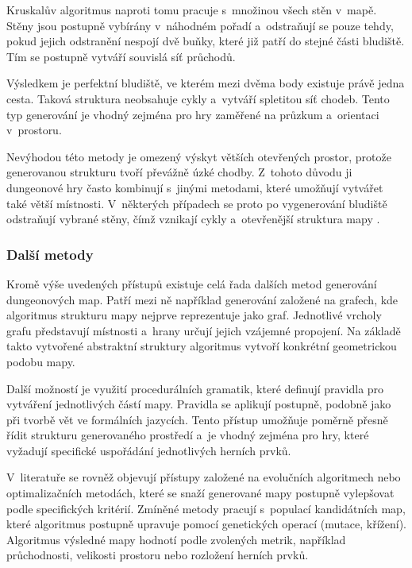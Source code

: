 \documentclass[
   program=itk,
   biblatex,
   figures=true,
   tables=true,
   glossaries,
   index
]{kidiplom}
\begin{document}
Kruskalův algoritmus naproti tomu pracuje s~množinou všech stěn v~mapě. Stěny jsou postupně vybírány v~náhodném pořadí a~odstraňují se pouze tehdy, pokud jejich odstranění nespojí dvě buňky, které již patří do stejné části bludiště. Tím se postupně vytváří souvislá síť průchodů.

Výsledkem je perfektní bludiště, ve kterém mezi dvěma body existuje právě jedna cesta. Taková struktura neobsahuje cykly a~vytváří spletitou síť chodeb. Tento typ generování je vhodný zejména pro hry zaměřené na průzkum a~orientaci v~prostoru.

Nevýhodou této metody je omezený výskyt větších otevřených prostor, protože generovanou strukturu tvoří převážně úzké chodby. Z~tohoto důvodu ji dungeonové hry často kombinují s~jinými metodami, které umožňují vytvářet také větší místnosti. V~některých případech se proto po vygenerování bludiště odstraňují vybrané stěny, čímž vznikají cykly a~otevřenější struktura mapy \cite{Linden2014,Shaker2016}.

\subsubsection{Další metody}

Kromě výše uvedených přístupů existuje celá řada dalších metod generování dungeonových map. Patří mezi ně například generování založené na grafech, kde algoritmus strukturu mapy nejprve reprezentuje jako graf. Jednotlivé vrcholy grafu představují místnosti a~hrany určují jejich vzájemné propojení. Na základě takto vytvořené abstraktní struktury algoritmus vytvoří konkrétní geometrickou podobu mapy.

Další možností je využití procedurálních gramatik, které definují pravidla pro vytváření jednotlivých částí mapy. Pravidla se aplikují postupně, podobně jako při tvorbě vět ve formálních jazycích. Tento přístup umožňuje poměrně přesně řídit strukturu generovaného prostředí a~je vhodný zejména pro hry, které vyžadují specifické uspořádání jednotlivých herních prvků.

V~literatuře se rovněž objevují přístupy založené na evolučních algoritmech nebo optimalizačních metodách, které se snaží generované mapy postupně vylepšovat podle specifických kritérií. Zmíněné metody pracují s~populací kandidátních map, které algoritmus postupně upravuje pomocí genetických operací (mutace, křížení). Algoritmus výsledné mapy hodnotí podle zvolených metrik, například průchodnosti, velikosti prostoru nebo rozložení herních prvků.
\end{document}
